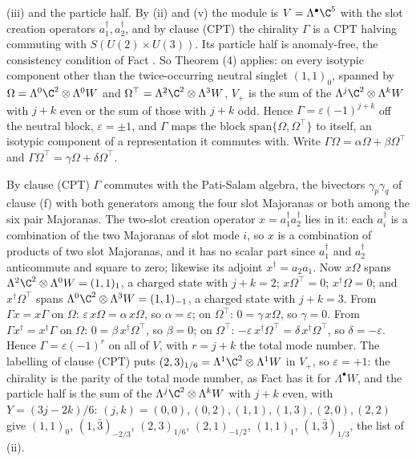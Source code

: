 (iii) and the particle half. By (ii) and (v) the module is $V = \Lambda^{\bullet}\C^{5}$ with the slot creation operators $a^{\dagger}_{1}, a^{\dagger}_{2}$, and by clause (CPT) the chirality $\Gamma$ is a CPT halving commuting with $S(U(2) \times U(3))$. Its particle half is anomaly-free, the consistency condition of Fact . So Theorem (4) applies: on every isotypic component other than the twice-occurring neutral singlet $(1,1)_{0}$, spanned by $\Omega = \Lambda^{0}\C^{2} \otimes \Lambda^{0}W$ and $\Omega^{\top} = \Lambda^{2}\C^{2} \otimes \Lambda^{3}W$, $V_{+}$ is the sum of the $\Lambda^{j}\C^{2} \otimes \Lambda^{k}W$ with $j + k$ even or the sum of those with $j + k$ odd. Hence $\Gamma = \varepsilon(-1)^{j + k}$ off the neutral block, $\varepsilon = \pm 1$, and $\Gamma$ maps the block $\mathrm{span}\{\Omega, \Omega^{\top}\}$ to itself, an isotypic component of a representation it commutes with. Write $\Gamma\Omega = \alpha\Omega + \beta\Omega^{\top}$ and $\Gamma\Omega^{\top} = \gamma\Omega + \delta\Omega^{\top}$.

By clause (CPT) $\Gamma$ commutes with the Pati-Salam algebra, the bivectors $\gamma_{p}\gamma_{q}$ of clause (f) with both generators among the four slot Majoranas or both among the six pair Majoranas. The two-slot creation operator $x = a^{\dagger}_{1}a^{\dagger}_{2}$ lies in it: each $a^{\dagger}_{i}$ is a combination of the two Majoranas of slot mode $i$, so $x$ is a combination of products of two slot Majoranas, and it has no scalar part since $a^{\dagger}_{1}$ and $a^{\dagger}_{2}$ anticommute and square to zero; likewise its adjoint $x^{\dagger} = a_{2}a_{1}$. Now $x\Omega$ spans $\Lambda^{2}\C^{2} \otimes \Lambda^{0}W = (1,1)_{1}$, a charged state with $j + k = 2$; $x\Omega^{\top} = 0$; $x^{\dagger}\Omega = 0$; and $x^{\dagger}\Omega^{\top}$ spans $\Lambda^{0}\C^{2} \otimes \Lambda^{3}W = (1,1)_{-1}$, a charged state with $j + k = 3$. From $\Gamma x = x\Gamma$ on $\Omega$: $\varepsilon\,x\Omega = \alpha\,x\Omega$, so $\alpha = \varepsilon$; on $\Omega^{\top}$: $0 = \gamma\,x\Omega$, so $\gamma = 0$. From $\Gamma x^{\dagger} = x^{\dagger}\Gamma$ on $\Omega$: $0 = \beta\,x^{\dagger}\Omega^{\top}$, so $\beta = 0$; on $\Omega^{\top}$: $-\varepsilon\,x^{\dagger}\Omega^{\top} = \delta\,x^{\dagger}\Omega^{\top}$, so $\delta = -\varepsilon$. Hence $\Gamma = \varepsilon(-1)^{r}$ on all of $V$, with $r = j + k$ the total mode number. The labelling of clause (CPT) puts $(2,3)_{1/6} = \Lambda^{1}\C^{2} \otimes \Lambda^{1}W$ in $V_{+}$, so $\varepsilon = +1$: the chirality is the parity of the total mode number, as Fact  has it for $\Lambda^{\bullet}W$, and the particle half is the sum of the $\Lambda^{j}\C^{2} \otimes \Lambda^{k}W$ with $j + k$ even, with $Y = (3j - 2k)/6$: $(j,k) = (0,0), (0,2), (1,1), (1,3), (2,0), (2,2)$ give $(1,1)_{0}$, $(1,\bar{3})_{-2/3}$, $(2,3)_{1/6}$, $(2,1)_{-1/2}$, $(1,1)_{1}$, $(1,\bar{3})_{1/3}$, the list of (ii).

